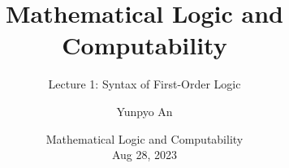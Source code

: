 \documentclass[aspectratio=169, handout]{beamer}
\title{Mathematical Logic and Computability}
\subtitle{Lecture 1: Syntax of First-Order Logic}
\author{Yunpyo An}
\institute[UNIST] {Ulsan National Institute of Science and Technology}
\date[Aug 28, 2023]
 {Mathematical Logic and Computability\\
  Aug 28, 2023}
\begin{document}
\frame{\titlepage} %
\section[Outline]{}
\frame{\tableofcontents}




%

 
\end{document}
